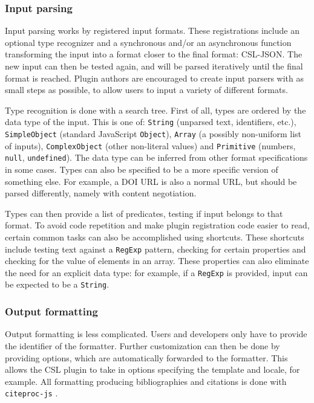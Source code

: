 \documentclass[fleqn,10pt,lineno]{wlpeerj} %
\begin{document}
\subsubsection*{Input parsing}

Input parsing works by registered input formats. These registrations include an optional type recognizer and a synchronous and/or an asynchronous function transforming the input into a format closer to the final format: CSL-JSON. The new input can then be tested again, and will be parsed iteratively until the final format is reached. Plugin authors are encouraged to create input parsers with as small steps as possible, to allow users to input a variety of different formats.

Type recognition is done with a search tree. First of all, types are ordered by the data type of the input. This is one of: \texttt{String} (unparsed text, identifiers, etc.), \texttt{SimpleObject} (standard JavaScript \texttt{Object}), \texttt{Array} (a possibly non-uniform list of inputs), \texttt{ComplexObject} (other non-literal values) and \texttt{Primitive} (numbers, \texttt{null}, \texttt{undefined}). The data type can be inferred from other format specifications in some cases. Types can also be specified to be a more specific version of something else. For example, a DOI URL is also a normal URL, but should be parsed differently, namely with content negotiation.

Types can then provide a list of predicates, testing if input belongs to that format. To avoid code repetition and make plugin registration code easier to read, certain common tasks can also be accomplished using shortcuts. These shortcuts include testing text against a \texttt{RegExp} pattern, checking for certain properties and checking for the value of elements in an array. These properties can also eliminate the need for an explicit data type: for example, if a \texttt{RegExp} is provided, input can be expected to be a \texttt{String}.

\subsubsection*{Output formatting}

Output formatting is less complicated. Users and developers only have to provide the identifier of the formatter. Further customization can then be done by providing options, which are automatically forwarded to the formatter. This allows the CSL plugin to take in options specifying the template and locale, for example. All formatting producing bibliographies and citations is done with \texttt{citeproc-js} \citep{Bennett2018Juris-M/citeproc-js}.
\end{document}
